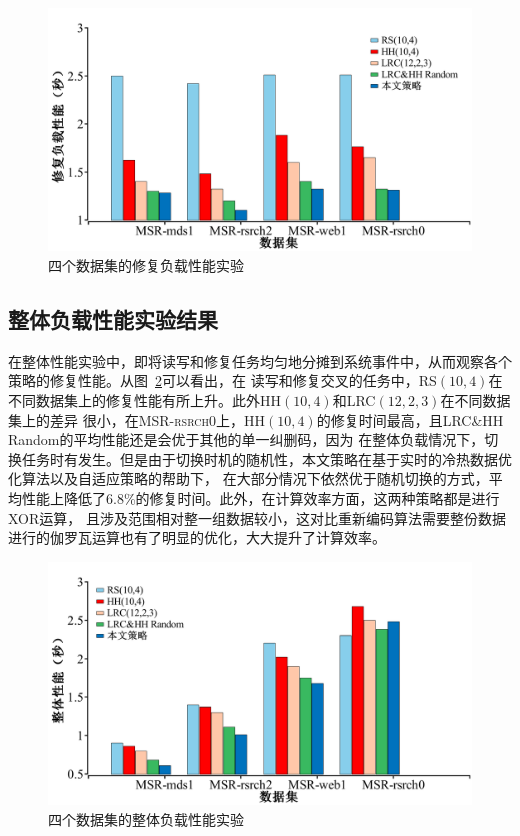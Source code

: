 \begin{figure}[htbp]
	\centering
	\includegraphics [scale=0.25]{figures/4-7.pdf}
	\caption{四个数据集的修复负载性能实验}
	\label{fig:4-7}
\end{figure}



\subsection{整体负载性能实验结果}


在整体性能实验中，即将读写和修复任务均匀地分摊到系统事件中，从而观察各个策略的修复性能。从图~\ref{fig:4-8}可以看出，在
读写和修复交叉的任务中，RS$(10,4)$在不同数据集上的修复性能有所上升。此外HH$(10,4)$和LRC$(12,2,3)$在不同数据集上的差异
很小，在\textsc{MSR-rsrch0}上，HH$(10,4)$的修复时间最高，且LRC\&HH Random的平均性能还是会优于其他的单一纠删码，因为
在整体负载情况下，切换任务时有发生。但是由于切换时机的随机性，本文策略在基于实时的冷热数据优化算法以及自适应策略的帮助下，
在大部分情况下依然优于随机切换的方式，平均性能上降低了6.8\%的修复时间。此外，在计算效率方面，这两种策略都是进行XOR运算，
且涉及范围相对整一组数据较小，这对比重新编码算法需要整份数据进行的伽罗瓦运算也有了明显的优化，大大提升了计算效率。


\begin{figure}[htbp]
	\centering
	\includegraphics [scale=0.2]{figures/4-8.pdf}
	\caption{四个数据集的整体负载性能实验}
	\label{fig:4-8}
\end{figure}

